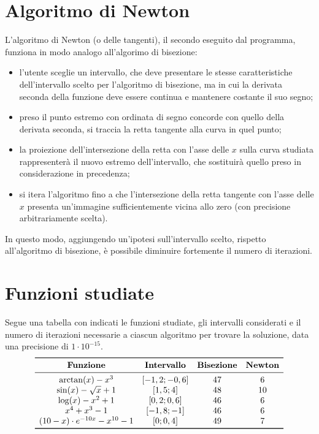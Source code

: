 \documentclass[a4paper]{article}
\begin{document}
\section{Algoritmo di Newton}

L'algoritmo di Newton (o delle tangenti), il secondo eseguito dal programma, funziona in modo analogo all'algorimo di bisezione:
\begin{itemize}
\item l'utente sceglie un intervallo, che deve presentare le stesse caratteristiche dell'intervallo scelto per l'algoritmo di bisezione, ma in cui la derivata seconda della funzione deve essere continua e mantenere costante il suo segno;
\item preso il punto estremo con ordinata di segno concorde con quello della derivata seconda, si traccia la retta tangente alla curva in quel punto;
\item la proiezione dell'intersezione della retta con l'asse delle $x$ sulla curva studiata rappresenterà il nuovo estremo dell'intervallo, che sostituirà quello preso in considerazione in precedenza;
\item si itera l'algoritmo fino a che l'intersezione della retta tangente con l'asse delle $x$ presenta un'immagine sufficientemente vicina allo zero (con precisione arbitrariamente scelta).
\end{itemize}

In questo modo, aggiungendo un'ipotesi sull'intervallo scelto, rispetto all'algoritmo di bisezione, è possibile diminuire fortemente il numero di iterazioni.

\section{Funzioni studiate}

Segue una tabella con indicati le funzioni studiate, gli intervalli considerati e il numero di iterazioni necessarie a ciascun algoritmo per trovare la soluzione, data una precisione di $1\cdot 10^{-15}$.
\[
\begin{array}{cccc}
\toprule
\textbf{Funzione} & \textbf{Intervallo} & \textbf{Bisezione} & \textbf{Newton} \\
\midrule
\arctan(x)-x^3 & [-1,2; -0,6] & 47 & 6 \\
\sin(x)-\sqrt{x}+1 & [1,5; 4] & 48 & 10 \\
\log(x)-x^2+1 & [0,2; 0,6] & 46 & 6 \\
x^4+x^3-1 & [-1,8; -1] & 46 & 6 \\
(10-x)\cdot e^{-10x}-x^{10}-1 & [0; 0,4] & 49 & 7 \\
\bottomrule
\end{array}
\]
\end{document}
